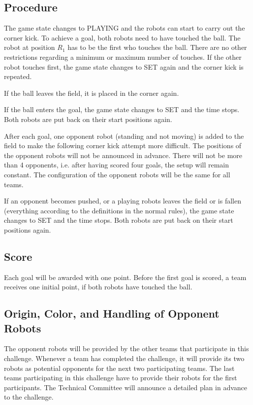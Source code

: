 \documentclass[12pt]{article}
\begin{document}
\subsection{Procedure}
The game state changes to PLAYING and the robots can start to carry out the corner kick. To achieve a goal, both robots need to have touched the ball. The robot at position $R_1$ has to be the first who touches the ball. There are no other restrictions regarding a minimum or maximum number of touches. If the other robot touches first, the game state changes to SET again and the corner kick is repeated.

If the ball leaves the field, it is placed in the corner again.

If the ball enters the goal, the game state changes to SET and the time stops. Both robots are put back on their start positions again.

After each goal, one opponent robot (standing and not moving) is added to the field to make the following corner kick attempt more difficult. The positions of the opponent robots will not be announced in advance. There will not be more than 4 opponents, i.e. after having scored four goals, the setup will remain constant. The configuration of the opponent robots will be the same for all teams. 

If an opponent becomes pushed, or a playing robots leaves the field or is fallen (everything according to the definitions in the normal rules), the game state changes to SET and the time stops. Both robots are put back on their start positions again.

\subsection{Score}
Each goal will be awarded with one point.
Before the first goal is scored, a team receives one initial point, if both robots have touched the ball.

\subsection{Origin, Color, and Handling of Opponent Robots}
The opponent robots will be provided by the other teams that participate in this challenge. Whenever a team has completed the challenge, it will provide its two robots as potential opponents for the next two participating teams. The last teams participating in this challenge have to provide their robots for the first participants. The Technical Committee will announce a detailed plan in advance to the challenge.
\end{document}
